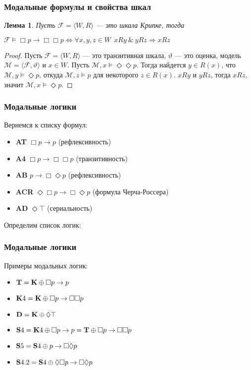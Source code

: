 \documentclass[pdf,utf8,russian,aspectratio=169]{beamer}
\newtheorem{lem}{Лемма}
\begin{document}
\begin{frame}
  \frametitle{Модальные формулы и свойства шкал}

  \begin{lem} Пусть $\mathcal{F} = \langle W, R \rangle$ --- это шкала Крипке, тогда

    $\mathcal{F} \models \Box p \to \Box \Box p \Leftrightarrow \forall x, y, z \in W \:\: x R y \: \& \: y R z \Rightarrow x R z$
  \end{lem}

\begin{proof} Пусть $\mathcal{F} = \langle W, R \rangle$ --- это транзитивная шкала,
  $\vartheta$ --- это оценка, модель $\mathcal{M} = \langle \mathcal{F}, \vartheta \rangle$ и $x \in W$. Пусть $\mathcal{M}, x \models \Diamond \Diamond p$. Тогда
  найдется $y \in R(x)$, что $\mathcal{M}, y \models \Diamond p$, откуда $\mathcal{M}, z \models p$ для некоторого $z \in R(x)$. $x R y$ и $y R z$, тогда $x R z$,
  значит $\mathcal{M}, x \models \Diamond p$.
\end{proof}
\end{frame}

\begin{frame}
  \frametitle{Модальные логики}

  Вернемся к списку формул:

  \begin{itemize}
    \item {\bf AT} $\Box p \to p$ (рефлексивность)
    \item {\bf A4} $\Box p \to \Box \Box p$ (транзитивность)
    \item {\bf AB} $p \to \Box \Diamond p$ (рефлексивность)
    \item {\bf ACR} $\Diamond \Box p \to \Box \Diamond p$ (формула Черча-Россера)
    \item {\bf AD} $\Diamond \top$ (сериальность)
  \end{itemize}

  Определим список логик:
\end{frame}

\begin{frame}
  \frametitle{Модальные логики}

  Примеры модальных логик:

\begin{itemize}
  \item ${\bf T} = {\bf K} \oplus \Box p \to p$
  \item ${\bf K}4 = {\bf K} \oplus \Box p \to \Box \Box p$
  \item ${\bf D} = {\bf K} \oplus \Diamond \top$
  \item ${\bf S}4 = {\bf K}4 \oplus \Box p \to p = {\bf T} \oplus \Box p \to \Box \Box p$
  \item ${\bf S}5 = {\bf S}4 \oplus p \to \Box \Diamond p$
  \item ${\bf S}4.2 = {\bf S}4 \oplus \Diamond \Box p \to \Box \Diamond p$
\end{itemize}
\end{frame}
\end{document}
